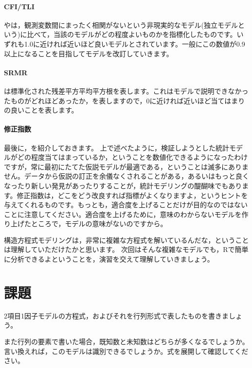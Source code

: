\documentclass{ltjsbook}
\begin{document}
\paragraph{CFI/TLI}
やは，観測変数間にまったく相関がないという非現実的なモデル(独立モデルという)に比べて，当該のモデルがどの程度よいものかを指標化したものです。いずれも1.0に近ければ近いほど良いモデルとされています。一般にこの数値が0.9以上になることを目指してモデルを改訂していきます。
\paragraph{SRMR}
は標準化された残差平方平均平方根を表します。これはモデルで説明できなかったものがどれほどあったか，を表しますので，0に近ければ近いほど当てはまりの良いことを表します。
\paragraph{修正指数}
最後に，を紹介しておきます。
上で述べたように，検証しようとした統計モデルがどの程度当てはまっているか，ということを数値化できるようになったわけですが，常に最初にたてた仮説モデルが最適である，ということは滅多にありません。データから仮説の訂正を余儀なくされることがある，あるいはもっと良くなったり新しい発見があったりすることが，統計モデリングの醍醐味でもあります。修正指数は，どこをどう改良すれば指標がよくなりますよ，というヒントを与えてくれるものです。もっとも，適合度を上げることだけが目的なのではないことに注意してください。適合度を上げるために，意味のわからないモデルを作り上げたところで，モデルの意味がないのですから。


構造方程式モデリングは，非常に複雑な方程式を解いているんだな，ということは理解していただけたかと思います。
次回はそんな複雑なモデルでも，Rで簡単に分析できるよということを，演習を交えて理解していきましょう。
\section{課題}
2項目1因子モデルの方程式，およびそれを行列形式で表したものを書きましょう。

また行列の要素で書いた場合，既知数と未知数はどちらが多くなるでしょうか。言い換えれば，このモデルは識別できるでしょうか。式を展開して確認してください。
\end{document}

